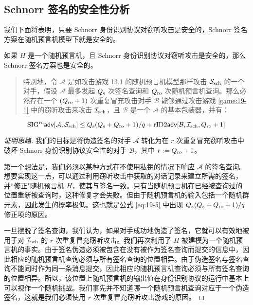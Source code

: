 \subsection{Schnorr 签名的安全性分析}

我们下面将表明，只要 Schnorr 身份识别协议对窃听攻击是安全的，Schnorr 签名方案在随机预言机模型下就是安全的。

\begin{theorem}\label{theo:19-7}
如果 $H$ 是一个随机预言机，且 Schnorr 身份识别协议对窃听攻击是安全的，那么 Schnorr 签名方案也是安全的。

\begin{quote}
特别地，令 $\mathcal{A}$ 是如攻击游戏 13.1 的随机预言机模型那样攻击  $\mathcal{S}_{\rm sch}$ 的一个对手，假设 $\mathcal{A}$ 最多发起 $Q_{\rm s}$ 次签名查询和 $Q_{\rm ro}$ 次随机预言机查询。那么必然存在一个 $(Q_{\rm ro}+1)$ 次重复冒充攻击对手 $\mathcal{B}$ 能够通过攻击游戏 \ref{game:19-1} 中的窃听攻击来攻击  $\mathcal{I}_{\rm sch}$，且 $\mathcal{B}$ 是一个 $\mathcal{A}$ 的基本包装器，并有：
\end{quote}
\begin{equation}\label{eq:19-5}
{\rm SIG^{ro}\mathsf{adv}}[\mathcal{A}, \mathcal{S}_{\rm sch}]\leq{Q_{\rm s}(Q_{\rm s}+Q_{\rm ro}+1)}/{q}+{\rm rID2\mathsf{adv}}[\mathcal{B},\mathcal{I}_{\rm sch},Q_{\rm ro}+1]
\end{equation}
\end{theorem}

\begin{proof}[证明思路]
我们的目标是将伪造签名的对手 $\mathcal{A}$ 转化为在 $r$ 次重复冒充窃听攻击中破坏 Schnorr 身份识别协议安全性的对手 $\mathcal{B}$，其中 $r:=Q_{\rm ro}+1$。

第一个想法是，我们必须以某种方式在不使用私钥的情况下响应 $\mathcal{A}$ 的签名查询。想要实现这一点，可以通过利用窃听攻击中获取的对话记录来建立所需的签名，并``修正"随机预言机 $H$，使其与签名一致。只有当随机预言机在已经被查询过的位置重新被查询时，这种修复才会失败。但由于随机预言机的输入包括一个随机群元素，因此发生的概率极低。这也就是公式 \ref{eq:19-5} 中出现 ${Q_s(Q_s+Q_{\rm ro}+1)}/{q}$ 修正项的原因。

一旦摆脱了签名查询，我们认为，如果对手成功地伪造了签名，它就可以有效地被用于对  $\mathcal{I}_{\rm sch}$ 的 $r$ 次重复冒充窃听攻击。我们再次利用了 $H$ 被建模为一个随机预言机的事实。由于签名伪造必须被包含在没有被作为签名查询而提交的信息中，因此相应的随机预言机查询必须与所有签名查询的位置相异。由于伪造签名与签名查询不能同时作为同一条消息提交，因此相应的随机预言机查询必须与所有签名查询的位置相异。所以，该位置上随机预言机的输出值在身份识别协议的运行中基本上可以视作一个随机挑战。我们事先并不知道哪一个随机预言机查询对应于一个伪造签名，这就是我们必须使用 $r$ 次重复冒充窃听攻击游戏的原因。
\end{proof}

